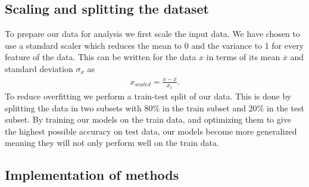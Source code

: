 \documentclass[11pt]{article}
\begin{document}
\subsection{Scaling and splitting the dataset}
To prepare our data for analysis we first scale the input data. We have chosen to use a standard scaler which reduces the mean to 0 and the variance to 1 for every feature of the data. This can be written for the data $x$ in terms of its mean $\overline{x}$ and standard deviation $\sigma_x$ as
\begin{align*}
    x_{scaled} = \frac{x - \overline{x}}{\sigma_x}.
\end{align*}
To reduce overfitting we perform a train-test split of our data. This is done by splitting the data in two subsets with 80\% in the train subset and 20\% in the test subset. By training our models on the train data, and optimizing them to give the highest possible accuracy on test data, our models become more generalized meaning they will not only perform well on the train data.

\subsection{Implementation of methods} %
\end{document}
